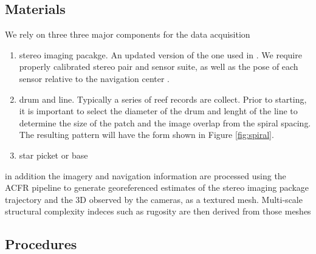 \subsection{Materials}
We rely on three three major components for the data acquisition
\begin{enumerate}
\item stereo imaging pacakge. An updated version of the one used in \cite{Henderson_2013}. We require properly calibrated stereo pair and sensor suite, as well as the pose of each sensor relative to the navigation center \cite{Johnson_Roberson_2013} \cite{}.
\item drum and line. Typically a series of reef records are collect. Prior to starting, it is important to select the diameter of the drum and lenght of the line to determine the size of the patch and the image overlap from the spiral spacing. The resulting pattern will have the form shown in Figure \ref{fig:spiral}.




\item star picket or base

\end{enumerate}



in addition the imagery and navigation information are processed using the ACFR pipeline \cite{Johnson_Roberson_2010} \cite{Mahon_2008} \cite{Johnson_Roberson_2013} to generate georeferenced estimates of the stereo imaging package trajectory and the 3D observed by the cameras, as a textured mesh. Multi-scale structural complexity indeces such as rugosity are then derived from those meshes \cite{Friedman_2012} 

\subsection{Procedures}

